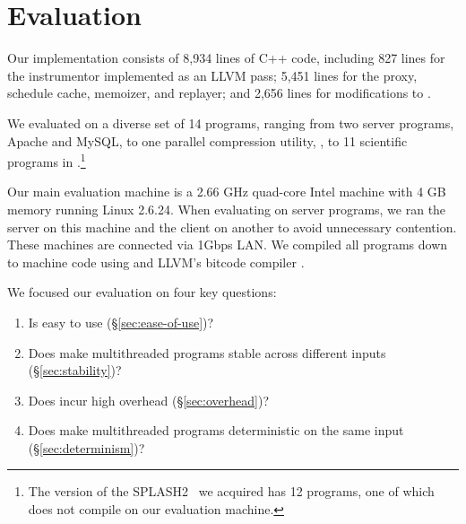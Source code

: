 \section{Evaluation}
\label{sec:evaluation}

Our \tern implementation consists of 8,934 lines of C++ code, including 827
lines for the instrumentor implemented as an LLVM pass; 5,451 lines for
the proxy, schedule cache, memoizer, and replayer; and 2,656 lines for
modifications to \klee.

We evaluated \tern on a diverse set of 14 programs, ranging from two server
programs, Apache and MySQL, to one parallel compression utility, \pbzip, to
11 scientific programs in \splash.\footnote{The version of the
  SPLASH2~\cite{lu:bugbench} we acquired has 12 programs, one of which does
  not compile on our evaluation machine.}

Our main evaluation machine is a 2.66 GHz quad-core Intel machine with 4
GB memory running Linux 2.6.24.  When evaluating \tern on server programs, we
ran the server on this machine and the client on another to avoid
unnecessary contention.  These machines are connected via 1Gbps LAN.  We
compiled all programs down to machine code using  and
LLVM's bitcode compiler .

We focused our evaluation on four key questions:
\begin{enumerate}

\item Is \tern easy to use (\S\ref{sec:ease-of-use})?

\item Does \tern make multithreaded programs stable across different inputs
  (\S\ref{sec:stability})?

\item Does \tern incur high overhead (\S\ref{sec:overhead})?

\item Does \tern make multithreaded programs deterministic on the same
  input (\S\ref{sec:determinism})?

\end{enumerate}





